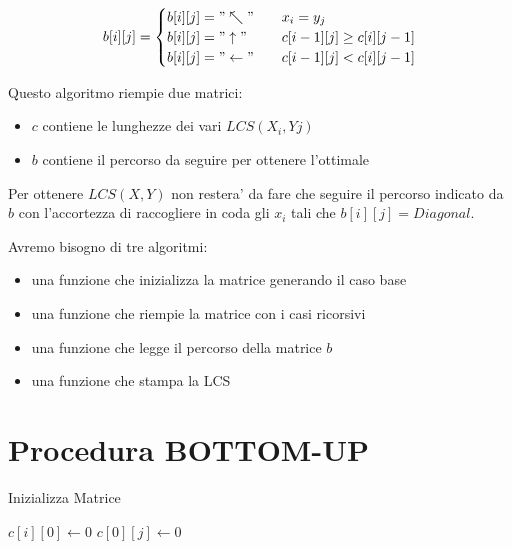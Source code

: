 \[
    b[i][j] =
    \begin{cases} 
        \text{$b[i][j] = "\nwarrow"$} & \quad \text{$x_{i} = y_{j}$} \\
        \text{$b[i][j] = "\uparrow"$} & \quad \text{$c[i-1][j] \geq c[i][j-1]$} \\
        \text{$b[i][j] = "\leftarrow"$} & \quad \text{$c[i-1][j] < c[i][j-1]$}
    \end{cases}
\]

Questo algoritmo riempie due matrici:
\begin{itemize}
    \item $c$ contiene le lunghezze dei vari $LCS(X_{i}, Y{j})$
    \item $b$ contiene il percorso da seguire per ottenere l'ottimale
\end{itemize}

Per ottenere $LCS(X, Y)$ non restera' da fare che seguire il percorso indicato da $b$ con l'accortezza di raccogliere in coda gli $x_{i}$ tali che $b[i][j] = Diagonal$.

Avremo bisogno di tre algoritmi:
\begin{itemize}
    \item una funzione che inizializza la matrice generando il caso base
    \item una funzione che riempie la matrice con i casi ricorsivi
    \item una funzione che legge il percorso della matrice $b$
    \item una funzione che stampa la LCS
\end{itemize}

\section{Procedura BOTTOM-UP}

\begin{algorithm}
    \renewcommand\thealgorithm{}
    \caption{Inizializza Matrice}
    \begin{algorithmic}
                \State $c[i][0] \gets 0$
            \EndFor
                \State $c[0][j] \gets 0$
            \EndFor
        \EndProcedure
    \end{algorithmic}
\end{algorithm}

